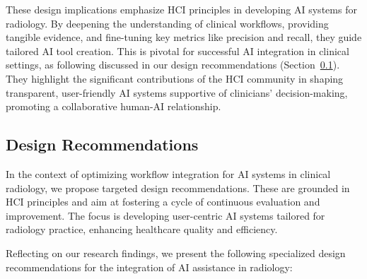 
\textcolor{revised}{These design implications emphasize \ac{HCI} principles in developing \ac{AI} systems for radiology.
By deepening the understanding of clinical workflows, providing tangible evidence, and fine-tuning key metrics like precision and recall, they guide tailored \ac{AI} tool creation.
This is pivotal for successful \ac{AI} integration in clinical settings, as following discussed in our design recommendations (Section~\ref{sec:chap005007003}).
They highlight the significant contributions of the \ac{HCI} community in shaping transparent, user-friendly \ac{AI} systems supportive of clinicians' decision-making, promoting a collaborative human-\acs{AI} relationship.}

\subsection{Design Recommendations}
\label{sec:chap005007003}

\textcolor{revised}{In the context of optimizing workflow integration for \ac{AI} systems in clinical radiology, we propose targeted design recommendations.
These are grounded in \ac{HCI} principles and aim at fostering a cycle of continuous evaluation and improvement.
The focus is developing user-centric \ac{AI} systems tailored for radiology practice, enhancing healthcare quality and efficiency.}

\vspace{1.00mm}

\noindent
\textcolor{revised}{Reflecting on our research findings, we present the following specialized design recommendations for the integration of \ac{AI} assistance in radiology:}

\vspace{0.025mm}

